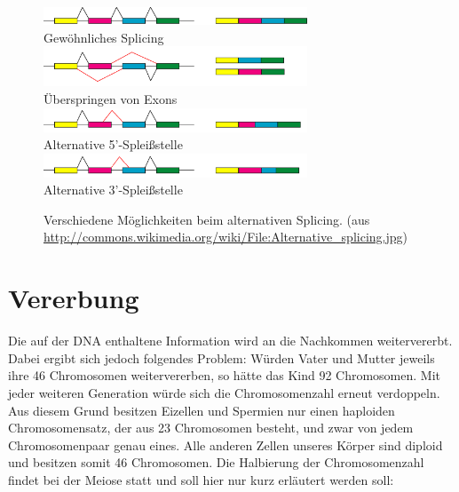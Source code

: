 \begin{figure}[htbp]
\begin{center}
\includegraphics[width=0.7\textwidth]{bilder/Splicing_1} \\
Gewöhnliches Splicing \\
\includegraphics[width=0.7\textwidth]{bilder/Splicing_4} \\
Überspringen von Exons \\
\includegraphics[width=0.7\textwidth]{bilder/Splicing_5} \\
Alternative 5'-Spleißstelle \\
\includegraphics[width=0.7\textwidth]{bilder/Splicing_6} \\
Alternative 3'-Spleißstelle
\end{center}
\caption[Alternatives Splicing (aus \protect\url{http://commons.wikimedia.org/wiki/File:Alternative_splicing.jpg})]{Verschiedene Möglichkeiten beim alternativen Splicing. (aus \protect\url{http://commons.wikimedia.org/wiki/File:Alternative_splicing.jpg})}
\label{fig:bio:pbysn:splicing}
\end{figure}

\section{Vererbung}
\label{sec:bio:erb}

Die auf der DNA enthaltene Information wird an die Nachkommen weitervererbt. Dabei ergibt sich jedoch folgendes Problem: Würden Vater und Mutter jeweils ihre 46 Chromosomen weitervererben, so hätte das Kind 92 Chromosomen. Mit jeder weiteren Generation würde sich die Chromosomenzahl erneut verdoppeln. Aus diesem Grund besitzen Eizellen und Spermien nur einen haploiden Chromosomensatz, der aus 23 Chromosomen besteht, und zwar von jedem Chromosomenpaar genau eines. Alle anderen Zellen unseres Körper sind diploid und besitzen somit 46 Chromosomen. Die Halbierung der Chromosomenzahl findet bei der Meiose statt und soll hier nur kurz erläutert werden soll:

